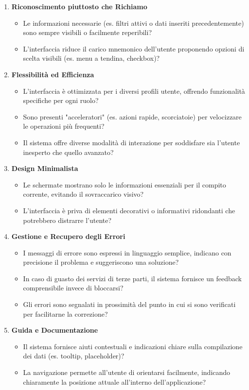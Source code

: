 \documentclass{article}
\begin{document}
\begin{enumerate}
    \item \textbf{Riconoscimento piuttosto che Richiamo}
    \begin{itemize}
        \item Le informazioni necessarie (es. filtri attivi o dati inseriti precedentemente) sono sempre visibili o facilmente reperibili?
        \item L'interfaccia riduce il carico mnemonico dell'utente proponendo opzioni di scelta visibili (es. menu a tendina, checkbox)?
    \end{itemize}

    \item \textbf{Flessibilità ed Efficienza}
    \begin{itemize}
        \item L'interfaccia è ottimizzata per i diversi profili utente, offrendo funzionalità specifiche per ogni ruolo?
        \item Sono presenti "acceleratori" (es. azioni rapide, scorciatoie) per velocizzare le operazioni più frequenti?
        \item Il sistema offre diverse modalità di interazione per soddisfare sia l'utente inesperto che quello avanzato?
    \end{itemize}

    \item \textbf{Design Minimalista}
    \begin{itemize}
        \item Le schermate mostrano solo le informazioni essenziali per il compito corrente, evitando il sovraccarico visivo?
        \item L'interfaccia è priva di elementi decorativi o informativi ridondanti che potrebbero distrarre l'utente?
    \end{itemize}

    \item \textbf{Gestione e Recupero degli Errori}
    \begin{itemize}
        \item I messaggi di errore sono espressi in linguaggio semplice, indicano con precisione il problema e suggeriscono una soluzione?
        \item In caso di guasto dei servizi di terze parti, il sistema fornisce un feedback comprensibile invece di bloccarsi?
        \item Gli errori sono segnalati in prossimità del punto in cui si sono verificati per facilitarne la correzione?
    \end{itemize}

    \item \textbf{Guida e Documentazione}
    \begin{itemize}
        \item Il sistema fornisce aiuti contestuali e indicazioni chiare sulla compilazione dei dati (es. tooltip, placeholder)?
        \item La navigazione permette all'utente di orientarsi facilmente, indicando chiaramente la posizione attuale all'interno dell'applicazione?
    \end{itemize}
\end{enumerate}
\newpage
\end{document}
